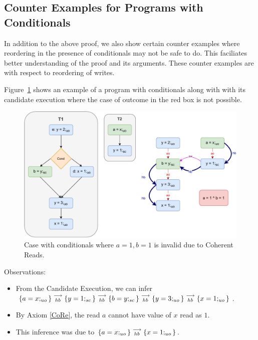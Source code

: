 \subsection{Counter Examples for Programs with Conditionals}
    
    In addition to the above proof, we also show certain counter examples where reordering in the presence of conditionals may not be safe to do. 
    This faciliates better understanding of the proof and its arguments. 
    These counter examples are with respect to reordering of writes. 
    
    Figure~\ref{reord:cond_counter_example1(a)} shows an example of a program with conditionals along with with its candidate execution where the case of outcome in the red box is not possible. 
    \begin{figure}[H]
        \centering 
        \includegraphics[scale=0.7]{5.InstructionReordering/5.ValidReorderingProgram/CounterExamples1a(Conditionals).pdf}
        \caption{Case with conditionals where $a = 1, b = 1$ is invalid due to Coherent Reads.}
        \label{reord:cond_counter_example1(a)}
    \end{figure}
    
    Observations:
    \begin{itemize}
        \item From the Candidate Execution, we can infer $\{a=x;_{uo}\}\stackrel{\longrightarrow}{_{hb}}\{y=1;_{sc}\}\stackrel{\longrightarrow}{_{hb}}\{b=y;_{sc}\}\stackrel{\longrightarrow}{_{hb}}\{y=3;_{uo}\}\stackrel{\longrightarrow}{_{hb}}\{x=1;_{uo}\}$.
        \item By Axiom \ref{CoRe}, the read $a$ cannot have value of $x$ read as $1$. 
        \item This inference was due to $\{a=x;_{uo}\}\stackrel{\longrightarrow}{_{hb}}\{x=1;_{uo}\}$.
    \end{itemize}
    
